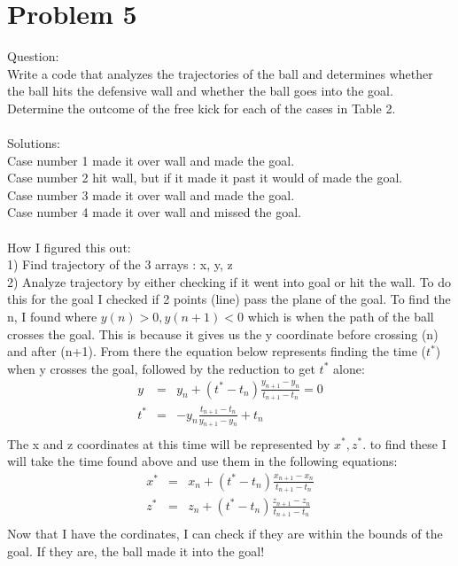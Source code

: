 \documentclass[12pt]{article}
\begin{document}
\section{Problem 5}\label{sec::Problem 5}
Question:\\
Write a code that analyzes the trajectories of the ball and determines whether the ball hits the
defensive wall and whether the ball goes into the goal. Determine the outcome of the free kick
for each of the cases in Table 2.\\
\\
Solutions:\\
Case number 1 made it over wall and made the goal.\\
Case number 2 hit wall, but if it made it past it would of made the goal.\\
Case number 3 made it over wall and made the goal.\\
Case number 4 made it over wall and missed the goal.\\
\\
How I figured this out:\\
1) Find trajectory of the 3 arrays : x, y, z\\
2) Analyze trajectory by either checking if it went into goal or hit the wall.  To do this for the goal I checked if 2 points (line) pass the plane of the goal.  To find the n, I found where $y(n)>0, y(n+1)<0$ which is when the path of the ball crosses the goal.  This is because it gives us the y coordinate  before crossing (n) and after (n+1).  From there the equation below represents finding the time ($t^*$) when y crosses the goal, followed by the reduction to get $t^*$ alone:
\begin{eqnarray}
y &=& y_n + (t^* - t_n)\frac{y_{n+1}-y_n}{t_{n+1}-t_n}=0\\\nonumber
t^* &=& -y_n\frac{t_{n+1}-t_n}{y_{n+1}-y_n} + t_n \\\nonumber
\end{eqnarray}
The x and z coordinates at this time will be represented by $x^*, z^*$.  to find these I will take the time found above and use them in the following equations:
\begin{eqnarray}
x^* &=& x_n + (t^* - t_n)\frac{x_{n+1}-x_n}{t_{n+1}-t_n}\\\nonumber
z^* &=& z_n + (t^* - t_n)\frac{z_{n+1}-z_n}{t_{n+1}-t_n}\\\nonumber
\end{eqnarray}
Now that I have the cordinates, I can check if they are within the bounds of the goal.  If they are, the ball made it into the goal!\\
\end{document}
